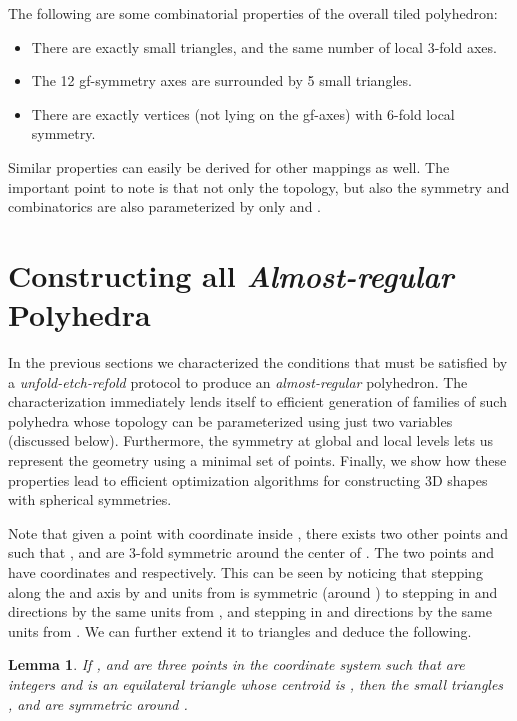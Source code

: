 \documentclass[11pt]{article}
\newtheorem{lemma}[thm]{Lemma}
\newcommand{\1}{\mathds{1}}
\begin{document}
The following are some combinatorial properties of the overall tiled polyhedron:
   \begin{itemize}
      \item There are exactly  small triangles, and the same number of local 3-fold axes.
      \item The 12 gf-symmetry axes are surrounded by 5 small triangles.
      \item There are exactly  vertices (not lying on the gf-axes) with 6-fold local symmetry.
   \end{itemize}

Similar properties can easily be derived for other mappings as well. The important point to note is that not only the topology, but also the symmetry and combinatorics are also parameterized by only  and .

\section{Constructing all \emph{Almost-regular} Polyhedra}
In the previous sections we characterized the conditions that must be satisfied by a \emph{unfold-etch-refold} protocol to produce an \emph{almost-regular} polyhedron. The characterization immediately lends itself to efficient generation of families of such polyhedra whose topology can be parameterized using just two variables (discussed below). Furthermore, the symmetry at global and local levels lets us represent the geometry using a minimal set of points. Finally, we show how these properties lead to efficient optimization algorithms for constructing 3D shapes with spherical symmetries.

Note that given a point  with coordinate  inside , there exists two other points  and  such that ,  and  are 3-fold symmetric around the center  of . The two points  and  have coordinates  and  respectively. This can be seen by noticing that stepping along the  and  axis by  and  units from  is  symmetric (around ) to stepping in  and  directions by the same units from , and stepping in  and  directions by the same units from . We can further extend it to triangles and deduce the following.

\begin{lemma}
If ,  and  are three points in the  coordinate system such that  are integers and  is an equilateral triangle whose centroid is , then the small triangles ,  and  are  symmetric around .
\label{lem:trisym2}
\end{lemma}
\end{document}
